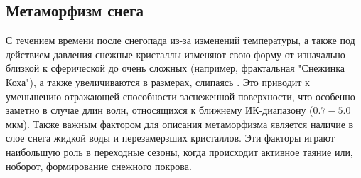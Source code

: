 \documentclass[a4paper, fontsize=14pt]{scrartcl}
\begin{document}
\subsection{Метаморфизм снега}

С течением времени после снегопада из-за изменений температуры, а также под действием давления снежные кристаллы изменяют свою форму от изначально близкой к сферической до очень сложных (например, фрактальная "Снежинка Коха"), а также увеличиваются в размерах, слипаясь \cite{Grenfell1999, Grenfell2005, He2018}. Это приводит к уменьшению отражающей способности заснеженной поверхности, что особенно заметно в случае длин волн, относящихся к ближнему ИК-диапазону ($0.7-5.0$ мкм). Также важным фактором для описания метаморфизма является наличие в слое снега жидкой воды и перезамерзших кристаллов. Эти факторы играют наибольшую роль в переходные сезоны, когда происходит активное таяние или, ноборот, формирование снежного покрова.
\end{document}
